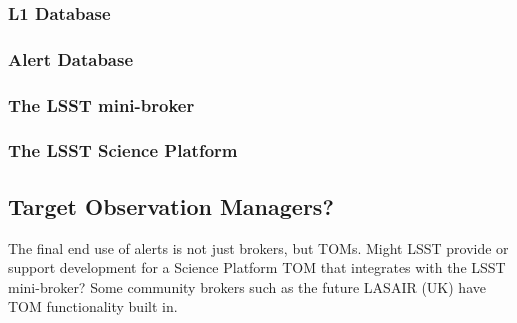 \subsubsection{L1 Database}

\subsubsection{Alert Database}

\subsubsection{The LSST mini-broker}

\subsubsection{The LSST Science Platform}

\subsection{Target Observation Managers?}

The final end use of alerts is not just brokers, but TOMs. Might LSST provide or support development for a Science Platform TOM that integrates with the LSST mini-broker? Some community brokers such as the future LASAIR (UK) have TOM functionality built in. 
